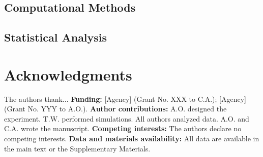 \documentclass[10pt]{article}
\begin{document}
\subsection{Computational Methods}

\subsection{Statistical Analysis}


\section*{Acknowledgments}
The authors thank...
\textbf{Funding:} [Agency] (Grant No. XXX to C.A.); [Agency] (Grant No. YYY to A.O.).
\textbf{Author contributions:} A.O. designed the experiment. T.W. performed simulations. All authors analyzed data. A.O. and C.A. wrote the manuscript.
\textbf{Competing interests:} The authors declare no competing interests.
\textbf{Data and materials availability:} All data are available in the main text or the Supplementary Materials.


\end{document}
